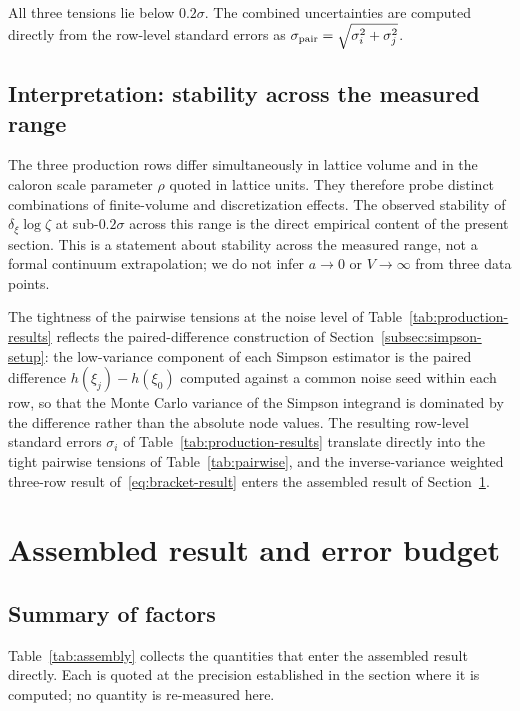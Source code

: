 \documentclass[a4paper,11pt]{article}
\theoremstyle{definition}
\begin{document}
All three tensions lie below $0.2\sigma$. The combined uncertainties
are computed directly from the row-level standard errors as
$\sigma_{\rm pair} = \sqrt{\sigma_i^2 + \sigma_j^2}$.

\subsection{Interpretation: stability across the measured range}
\label{subsec:lattice-independence}

The three production rows differ simultaneously in lattice volume
and in the caloron scale parameter $\rho$ quoted in lattice units.
They therefore probe distinct combinations of finite-volume and
discretization effects. The observed stability of
$\delta_\xi \log\zeta$ at sub-$0.2\sigma$ across this range is the direct empirical content of the present section. This is a statement about stability across the
measured range, not a formal continuum extrapolation; we do not infer $a \to 0$ or
$V \to \infty$ from three data points.

The tightness of the pairwise tensions at the noise level of
Table~\ref{tab:production-results} reflects the paired-difference
construction of Section~\ref{subsec:simpson-setup}: the low-variance
component of each Simpson estimator is the paired difference
$h(\xi_j) - h(\xi_0)$ computed against a common noise seed within
each row, so that the Monte Carlo variance of the Simpson integrand
is dominated by the difference rather than the absolute node values.
The resulting row-level standard errors $\sigma_i$ of
Table~\ref{tab:production-results} translate directly into the tight
pairwise tensions of Table~\ref{tab:pairwise}, and the
inverse-variance weighted three-row result of~\eqref{eq:bracket-result}
enters the assembled result of Section~\ref{sec:assembled}.


\section{Assembled result and error budget}
\label{sec:assembled}

\subsection{Summary of factors}
\label{subsec:assembly-summary}

Table~\ref{tab:assembly} collects the quantities that enter the
assembled result directly. Each is quoted at the precision
established in the section where it is computed; no quantity is
re-measured here.
\end{document}
